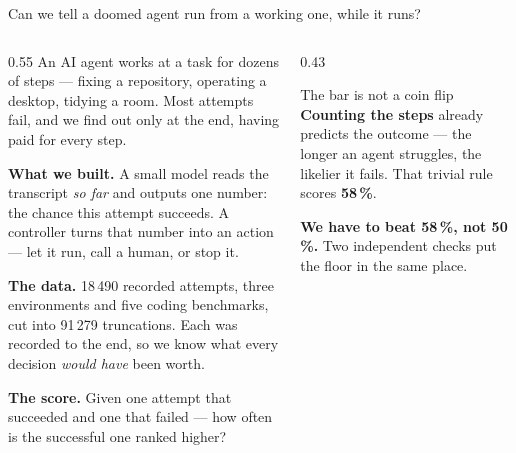 \documentclass[11pt, aspectratio=169]{beamer}
\newcommand{\g}[1]{\textcolor{accent2}{\textbf{#1}}}
\newcommand{\bad}[1]{\textcolor{warn}{\textbf{#1}}}
\begin{document}
\begin{frame}{Can we tell a doomed agent run from a working one, while it runs?}
\footnotesize
\begin{columns}[t]
\begin{column}{0.55\textwidth}
An AI agent works at a task for dozens of steps --- fixing a repository,
operating a desktop, tidying a room. Most attempts fail, and we find out only
at the end, having paid for every step.

\medskip
\textbf{What we built.} A small model reads the transcript \emph{so far} and
outputs one number: the chance this attempt succeeds. A controller turns that
number into an action --- let it run, call a human, or stop it.

\medskip
\textbf{The data.} 18\,490 recorded attempts, three environments and five
coding benchmarks, cut into 91\,279 truncations. Each was recorded to the end,
so we know what every decision \emph{would have} been worth.

\medskip
\textbf{The score.} Given one attempt that succeeded and one that failed --- how
often is the successful one ranked higher?
\end{column}
\begin{column}{0.43\textwidth}
\begin{center}
\end{center}
\begin{block}{The bar is not a coin flip}
\textbf{Counting the steps} already predicts the outcome --- the longer an
agent struggles, the likelier it fails. That trivial rule scores \g{58\,\%}.

\medskip
\bad{We have to beat 58\,\%, not 50\,\%.} Two independent checks put the floor
in the same place.
\end{block}
\end{column}
\end{columns}
\end{frame}
\end{document}

